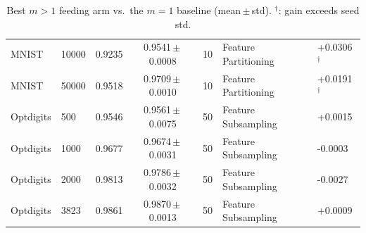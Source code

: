 \begin{table}[ht]
\begin{tabular}{llcclll}
MNIST & 10000 & 0.9235 & 0.9541\,$\pm$\,0.0008 & 10 & Feature Partitioning & +0.0306$^\dagger$ \\
MNIST & 50000 & 0.9518 & 0.9709\,$\pm$\,0.0010 & 10 & Feature Partitioning & +0.0191$^\dagger$ \\
Optdigits & 500 & 0.9546 & 0.9561\,$\pm$\,0.0075 & 50 & Feature Subsampling & +0.0015 \\
Optdigits & 1000 & 0.9677 & 0.9674\,$\pm$\,0.0031 & 50 & Feature Subsampling & -0.0003 \\
Optdigits & 2000 & 0.9813 & 0.9786\,$\pm$\,0.0032 & 50 & Feature Subsampling & -0.0027 \\
Optdigits & 3823 & 0.9861 & 0.9870\,$\pm$\,0.0013 & 50 & Feature Subsampling & +0.0009 \\
\bottomrule
\end{tabular}
\caption{Best $m>1$ feeding arm vs.\ the $m=1$ baseline (mean\,$\pm$\,std). $^\dagger$: gain exceeds seed std.}
\label{tab:mgain}
\end{table}
